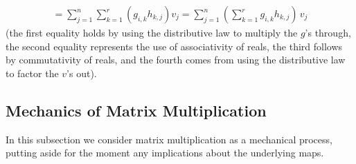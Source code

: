 \begin{exercises}
\begin{answer}
\begin{exparts}
\begin{multline*}
              =\sum_{j=1}^n \sum_{k=1}^r (g_{i,k}h_{k,j})v_j 
              =\sum_{j=1}^n (\sum_{k=1}^r g_{i,k}h_{k,j})\,v_j
           \end{multline*}
           (the first equality holds by using the distributive law to multiply
           the $g$'s through, the second equality represents the use of 
           associativity of reals, the third follows by commutativity of
           reals, and the fourth comes from using 
           the distributive law to factor the $v$'s out).
       \end{exparts} 
    \end{answer}
\end{exercises}





















\subsection{Mechanics of Matrix Multiplication}
In this subsection we consider matrix multiplication as a mechanical process, 
putting aside for the moment any implications about the underlying maps.

